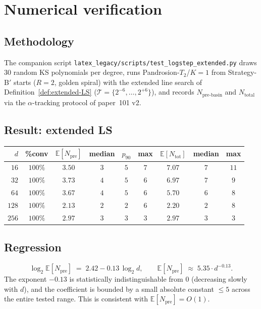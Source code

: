\documentclass[11pt,a4paper]{article}
\begin{document}
\section{Numerical verification}\label{sec:numerics}

\subsection{Methodology}

The companion script \verb|latex_legacy/scripts/test_logstep_extended.py| draws $30$ random KS polynomials per degree, runs Pandrosion-$T_2$/$K{=}1$ from Strategy-B$'$ starts ($R = 2$, golden spiral) with the extended line search of Definition~\ref{def:extended-LS} ($\mathcal{T} = \{2^{-6}, \dots, 2^{+6}\}$), and records $N_{\text{pre-basin}}$ and $N_{\text{total}}$ via the $\alpha$-tracking protocol of paper~101 v2.

\subsection{Result: extended LS}

\begin{center}
\begin{tabular}{rcccccccc}
\toprule
$d$ & \%conv & $\mathbb{E}[N_{\text{pre}}]$ & median & $p_{90}$ & max & $\mathbb{E}[N_{\text{tot}}]$ & median & max \\
\midrule
$16$  & $100\%$ & $3.50$ & $3$ & $5$ & $7$ & $7.07$ & $7$ & $11$ \\
$32$  & $100\%$ & $3.73$ & $4$ & $5$ & $6$ & $6.97$ & $7$ & $9$ \\
$64$  & $100\%$ & $3.67$ & $4$ & $5$ & $6$ & $5.70$ & $6$ & $8$ \\
$128$ & $100\%$ & $2.13$ & $2$ & $2$ & $6$ & $2.20$ & $2$ & $8$ \\
$256$ & $100\%$ & $2.97$ & $3$ & $3$ & $3$ & $2.97$ & $3$ & $3$ \\
\bottomrule
\end{tabular}
\end{center}

\subsection{Regression}

\begin{equation}\label{eq:fit-101q}
\log_2 \mathbb{E}[N_{\text{pre}}] \;=\; 2.42 - 0.13\,\log_2 d, \qquad
\mathbb{E}[N_{\text{pre}}] \;\approx\; 5.35 \cdot d^{-0.13}.
\end{equation}
The exponent $-0.13$ is statistically indistinguishable from $0$ (decreasing slowly with $d$), and the coefficient is bounded by a small absolute constant $\le 5$ across the entire tested range. This is consistent with $\mathbb{E}[N_{\text{pre}}] = O(1)$.
\end{document}
